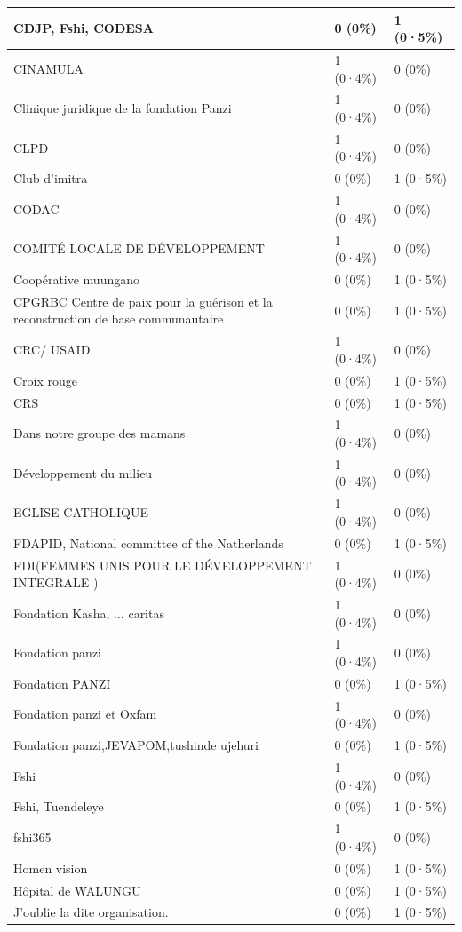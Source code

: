 \documentclass[
]{book}
\begin{document}
\begin{tabular}{l|l|l}
\hline
CDJP, Fshi, CODESA & 0 (0\%) & 1 (0·5\%)\\
\hline
CINAMULA & 1 (0·4\%) & 0 (0\%)\\
\hline
Clinique juridique de la fondation Panzi & 1 (0·4\%) & 0 (0\%)\\
\hline
CLPD & 1 (0·4\%) & 0 (0\%)\\
\hline
Club d'imitra & 0 (0\%) & 1 (0·5\%)\\
\hline
CODAC & 1 (0·4\%) & 0 (0\%)\\
\hline
COMITÉ LOCALE DE DÉVELOPPEMENT & 1 (0·4\%) & 0 (0\%)\\
\hline
Coopérative muungano & 0 (0\%) & 1 (0·5\%)\\
\hline
CPGRBC Centre de paix pour la guérison et la reconstruction de base communautaire & 0 (0\%) & 1 (0·5\%)\\
\hline
CRC/ USAID & 1 (0·4\%) & 0 (0\%)\\
\hline
Croix rouge & 0 (0\%) & 1 (0·5\%)\\
\hline
CRS & 0 (0\%) & 1 (0·5\%)\\
\hline
Dans notre groupe des mamans & 1 (0·4\%) & 0 (0\%)\\
\hline
Développement du milieu & 1 (0·4\%) & 0 (0\%)\\
\hline
EGLISE CATHOLIQUE & 1 (0·4\%) & 0 (0\%)\\
\hline
FDAPID, National committee of the Natherlands & 0 (0\%) & 1 (0·5\%)\\
\hline
FDI(FEMMES UNIS POUR LE DÉVELOPPEMENT INTEGRALE ) & 1 (0·4\%) & 0 (0\%)\\
\hline
Fondation Kasha, ... caritas & 1 (0·4\%) & 0 (0\%)\\
\hline
Fondation panzi & 1 (0·4\%) & 0 (0\%)\\
\hline
Fondation PANZI & 0 (0\%) & 1 (0·5\%)\\
\hline
Fondation panzi et Oxfam & 1 (0·4\%) & 0 (0\%)\\
\hline
Fondation panzi,JEVAPOM,tushinde ujehuri & 0 (0\%) & 1 (0·5\%)\\
\hline
Fshi & 1 (0·4\%) & 0 (0\%)\\
\hline
Fshi, Tuendeleye & 0 (0\%) & 1 (0·5\%)\\
\hline
fshi365 & 1 (0·4\%) & 0 (0\%)\\
\hline
Homen vision & 0 (0\%) & 1 (0·5\%)\\
\hline
Hôpital de WALUNGU & 0 (0\%) & 1 (0·5\%)\\
\hline
J'oublie la dite organisation. & 0 (0\%) & 1 (0·5\%)\\

\end{tabular}
\end{document}
